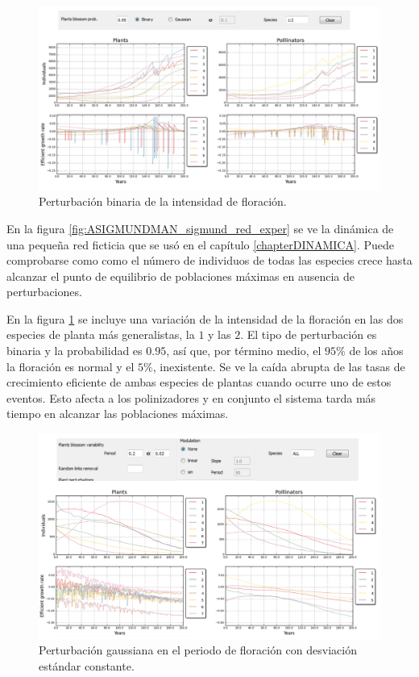 \begin{figure}[h!]
\centering
\includegraphics[scale=1]{ManFigs/sigmund_oscilacion_intensidad.png}
\caption{Perturbación binaria de la intensidad de floración.}
\label{fig:ASIGMUNDMAN_sigmund_oscilacion_intensidad}
\end{figure}

En la figura \ref{fig:ASIGMUNDMAN_sigmund_red_exper} se ve la dinámica de una pequeña red ficticia que se usó en el capítulo \ref{chapterDINAMICA}. Puede comprobarse como como el número de individuos de todas las especies crece hasta alcanzar el punto de equilibrio de poblaciones máximas en ausencia de perturbaciones. 

En la figura \ref{fig:ASIGMUNDMAN_sigmund_oscilacion_intensidad} se incluye una variación de la intensidad de la floración en las dos especies de planta más generalistas, la $1$ y las $2$. El tipo de perturbación es binaria y la probabilidad es $0.95$, así que, por término medio, el $95\%$ de los años la floración es normal y el $5\%$, inexistente. Se ve la caída abrupta de las tasas
de crecimiento eficiente de ambas especies de plantas cuando ocurre uno de estos eventos. Esto afecta a los polinizadores y en conjunto el sistema tarda más tiempo en alcanzar las poblaciones máximas.

\begin{figure}[h!]
\centering
\includegraphics[scale=1]{ManFigs/sigmund_oscilacion_tiempo_none.png}
\caption{Perturbación gaussiana en el periodo de floración con desviación estándar constante.}
\label{fig:ASIGMUNDMAN_sigmund_oscilacion_tiempo_none}
\end{figure}


